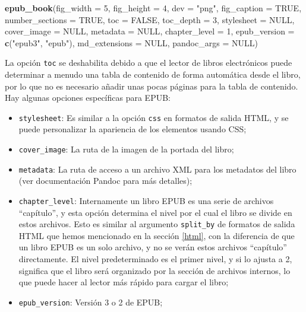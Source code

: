 \documentclass[12pt,]{krantz}
\makeatletter
\newenvironment{Shaded}{\begin{snugshade}}{\end{snugshade}}
\newcommand{\KeywordTok}[1]{\textcolor[rgb]{0.13,0.29,0.53}{\textbf{#1}}}
\newcommand{\DataTypeTok}[1]{\textcolor[rgb]{0.13,0.29,0.53}{#1}}
\newcommand{\DecValTok}[1]{\textcolor[rgb]{0.00,0.00,0.81}{#1}}
\newcommand{\StringTok}[1]{\textcolor[rgb]{0.31,0.60,0.02}{#1}}
\newcommand{\OtherTok}[1]{\textcolor[rgb]{0.56,0.35,0.01}{#1}}
\newcommand{\NormalTok}[1]{#1}
\providecommand{\tightlist}{%
  \setlength{\itemsep}{0pt}\setlength{\parskip}{0pt}}
\newenvironment{kframe}{%
\medskip{}
\setlength{\fboxsep}{.8em}
 \def\at@end@of@kframe{}%
 \ifinner\ifhmode%
  \def\at@end@of@kframe{\end{minipage}}%
  \begin{minipage}{\columnwidth}%
 \fi\fi%
 \def\FrameCommand##1{\hskip\@totalleftmargin \hskip-\fboxsep
 \colorbox{shadecolor}{##1}\hskip-\fboxsep
     \hskip-\linewidth \hskip-\@totalleftmargin \hskip\columnwidth}%
 \MakeFramed {\advance\hsize-\width
   \@totalleftmargin\z@ \linewidth\hsize
   \@setminipage}}%
 {\par\unskip\endMakeFramed%
 \at@end@of@kframe}
\renewenvironment{Shaded}{\begin{kframe}}{\end{kframe}}
\theoremstyle{definition}
\theoremstyle{definition}
\theoremstyle{definition}
\theoremstyle{remark}
\makeatother
\begin{document}
\begin{Shaded}
\begin{Highlighting}[]
\KeywordTok{epub_book}\NormalTok{(}\DataTypeTok{fig_width =} \DecValTok{5}\NormalTok{, }\DataTypeTok{fig_height =} \DecValTok{4}\NormalTok{, }\DataTypeTok{dev =} \StringTok{"png"}\NormalTok{,}
  \DataTypeTok{fig_caption =} \OtherTok{TRUE}\NormalTok{, }\DataTypeTok{number_sections =} \OtherTok{TRUE}\NormalTok{,}
  \DataTypeTok{toc =} \OtherTok{FALSE}\NormalTok{, }\DataTypeTok{toc_depth =} \DecValTok{3}\NormalTok{, }\DataTypeTok{stylesheet =} \OtherTok{NULL}\NormalTok{,}
  \DataTypeTok{cover_image =} \OtherTok{NULL}\NormalTok{, }\DataTypeTok{metadata =} \OtherTok{NULL}\NormalTok{,}
  \DataTypeTok{chapter_level =} \DecValTok{1}\NormalTok{, }\DataTypeTok{epub_version =} \KeywordTok{c}\NormalTok{(}\StringTok{"epub3"}\NormalTok{, }\StringTok{"epub"}\NormalTok{),}
  \DataTypeTok{md_extensions =} \OtherTok{NULL}\NormalTok{, }\DataTypeTok{pandoc_args =} \OtherTok{NULL}\NormalTok{)}
\end{Highlighting}
\end{Shaded}

La opción \texttt{toc} se deshabilita debido a que el lector de libros
electrónicos puede determinar a menudo una tabla de contenido de forma
automática desde el libro, por lo que no es necesario añadir unas pocas
páginas para la tabla de contenido. Hay algunas opciones específicas
para EPUB:

\begin{itemize}
\tightlist
\item
  \texttt{stylesheet}: Es similar a la opción \texttt{css} en formatos
  de salida HTML, y se puede personalizar la apariencia de los elementos
  usando CSS;
\item
  \texttt{cover\_image}: La ruta de la imagen de la portada del libro;
\item
  \texttt{metadata}: La ruta de acceso a un archivo XML para los
  metadatos del libro (ver documentación Pandoc para más detalles);
\item
  \texttt{chapter\_level}: Internamente un libro EPUB es una serie de
  archivos ``capítulo'', y esta opción determina el nivel por el cual el
  libro se divide en estos archivos. Esto es similar al argumento
  \texttt{split\_by} de formatos de salida HTML que hemos mencionado en
  la sección \ref{html}, con la diferencia de que un libro EPUB es un
  solo archivo, y no se verán estos archivos ``capítulo'' directamente.
  El nivel predeterminado es el primer nivel, y si lo ajusta a 2,
  significa que el libro será organizado por la sección de archivos
  internos, lo que puede hacer al lector más rápido para cargar el
  libro;
\item
  \texttt{epub\_version}: Versión 3 o 2 de EPUB;
\end{itemize}
\end{document}
